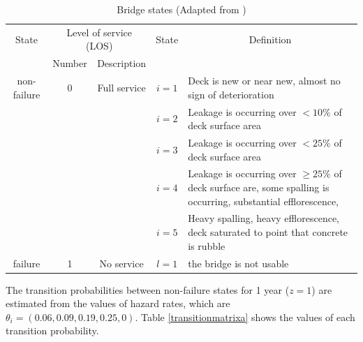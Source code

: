 \documentclass[]{article}
\begin{document}
\begin{table}[H]
\caption{Bridge states (Adapted from \citep{Lethanh2015})}


\begin{centering}
\begin{tabular}{p{2cm}|p{1cm}|p{1.5cm}|l|p{6cm}}
\hline 
\multicolumn{1}{c|}{State} & \multicolumn{2}{c|}{Level of service (LOS)} & \multicolumn{1}{c|}{State} & \multicolumn{1}{c}{Definition}\tabularnewline
\cline{2-3} \cline{5-5} 
\multicolumn{1}{c|}{} & \multicolumn{1}{c|}{Number} & \multicolumn{1}{c|}{Description} & \multicolumn{1}{c|}{} & \tabularnewline
\hline 
\multicolumn{1}{c|}{non-failure} & \multicolumn{1}{c|}{0} & \multicolumn{1}{c|}{Full service} & \multicolumn{1}{c|}{$i=1$} & Deck is new or near new, almost no sign of deterioration \tabularnewline
\cline{4-5} 
\multicolumn{1}{c|}{} & \multicolumn{1}{c|}{} & \multicolumn{1}{c|}{} & \multicolumn{1}{c|}{$i=2$} & Leakage is occurring over $<10\%$ of deck surface area \tabularnewline
\cline{4-5} 
\multicolumn{1}{c|}{} & \multicolumn{1}{c|}{} & \multicolumn{1}{c|}{} & \multicolumn{1}{c|}{$i=3$} & Leakage is occurring over $<25\%$ of deck surface area \tabularnewline
\cline{4-5} 
\multicolumn{1}{c|}{} & \multicolumn{1}{c|}{} & \multicolumn{1}{c|}{} & \multicolumn{1}{c|}{$i=4$} & Leakage is occurring over $\ge25\%$ of deck surface are, some spalling
is occurring, substantial efflorescence, \tabularnewline
\cline{4-5} 
\multicolumn{1}{c|}{} & \multicolumn{1}{c|}{} & \multicolumn{1}{c|}{} & \multicolumn{1}{c|}{$i=5$} & Heavy spalling, heavy efflorescence, deck saturated to point that
concrete is rubble \tabularnewline
\hline 
\multicolumn{1}{c|}{failure} & \multicolumn{1}{c|}{1} & \multicolumn{1}{c|}{No service} & \multicolumn{1}{c|}{$l=1$} & the bridge is not usable \tabularnewline
\hline 
\end{tabular}
\par\end{centering}

\label{statedefinition} 
\end{table}

The transition probabilities between non-failure states for 1 year
($z=1$) are estimated from the values of hazard rates, which are
$\theta_{i}=(0.06,0.09,0.19,0.25,0)$. Table \ref{transitionmatrixa}
shows the values of each transition probability.
\end{document}
